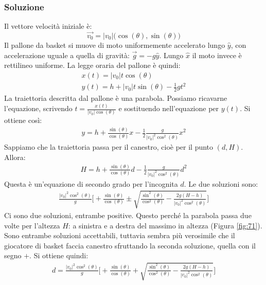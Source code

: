 \documentclass[12pt,a4paper]{book}
\begin{document}
\subsubsection*{Soluzione}
Il vettore velocità iniziale è:
%
\begin{equation*}
\vec{v_0}=|v_0| \big(\cos(\theta), \sin(\theta)\big)
\end{equation*}
%
Il pallone da basket si muove di moto uniformemente accelerato lungo $\hat{y}$, con accelerazione uguale a quella di gravità: $\vec{g}=-g \hat{y}$. Lungo $\hat{x}$ il moto invece è rettilineo uniforme. La legge oraria del pallone è quindi: 
%
\begin{gather*}
x(t)= |v_0| t \cos(\theta)\\
y(t)= h + |v_0| t \sin(\theta) - \frac{1}{2} g t^2
\end{gather*} 
%
La traiettoria descritta dal pallone è una parabola. Possiamo ricavarne l'equazione, scrivendo $t=\frac{x(t)}{|v_0|  \cos(\theta)}$ e sostituendo nell'equazione per $y(t)$. Si ottiene così: 
%
\begin{gather*}
y= h + \frac{\sin(\theta)}{\cos(\theta)} x - \frac{1}{2}  \frac{g}{|v_0|^2  \cos^2(\theta)}x^2
\end{gather*} 
%
Sappiamo che la traiettoria passa per il canestro, cioè per il punto $(d,H)$. Allora:
%
\begin{gather*}
H= h + \frac{\sin(\theta)}{\cos(\theta)} d - \frac{1}{2}  \frac{g}{|v_0|^2  \cos^2(\theta)}d^2
\end{gather*} 
%
Questa è un'equazione di secondo grado per l'incognita $d$. Le due soluzioni sono:
%
\begin{gather*}
\frac{|v_0|^2 \cos^2(\theta)}{g}\bigg[+\frac{\sin(\theta)}{\cos(\theta)} \pm \sqrt{\frac{\sin^2(\theta)}{\cos^2(\theta)} - \frac{2 g (H-h)}{|v_0|^2  \cos^2(\theta)} }\bigg] 
\end{gather*} 
%
Ci sono due soluzioni, entrambe positive. Questo perché la parabola passa due volte per l'altezza $H$: a sinistra e a destra del massimo in altezza (Figura \ref{fig:71}). Sono entrambe soluzioni accettabili,  tuttavia sembra più verosimile che il giocatore di basket faccia canestro sfruttando la seconda soluzione, quella con il segno $+$. Si ottiene quindi:
%
\begin{gather*}
d=\frac{|v_0|^2 \cos^2(\theta)}{g}\bigg[+\frac{\sin(\theta)}{\cos(\theta)} + \sqrt{\frac{\sin^2(\theta)}{\cos^2(\theta)} - \frac{2 g (H-h)}{|v_0|^2  \cos^2(\theta)} }\bigg] 
\end{gather*} 
%
\end{document}
